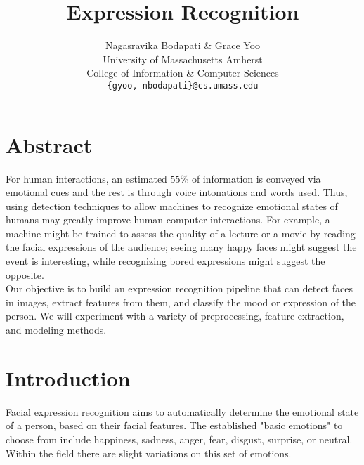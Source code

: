 \documentclass[10pt,twocolumn,letterpaper]{article}
\begin{document}
\title{Expression Recognition}

\author{Nagasravika Bodapati \& Grace Yoo \\ 
University of Massachusetts Amherst \\ 
College of Information \& Computer Sciences \\
{\tt\small \{gyoo, nbodapati\}@cs.umass.edu} \\
}

\maketitle

\section{Abstract} 
For human interactions, an estimated $55\%$ of information is conveyed via emotional cues and the rest is through voice intonations and words used. Thus, using detection techniques to allow machines to recognize emotional states of humans may greatly improve human-computer interactions. For example, a machine might be trained to assess the quality of a lecture or a movie by reading the facial expressions of the audience; seeing many happy faces might suggest the event is interesting, while recognizing bored expressions might suggest the opposite.  \\

\noindent Our objective is to build an expression recognition pipeline that can detect faces in images, extract features from them, and classify the mood or expression of the person. We will experiment with a variety of preprocessing, feature extraction, and modeling methods.

\section{Introduction}
Facial expression recognition aims to automatically determine the emotional state of a person, based on their facial features. The established "basic emotions" to choose from include happiness, sadness, anger, fear, disgust, surprise, or neutral. Within the field there are slight variations on this set of emotions. 
\end{document}
